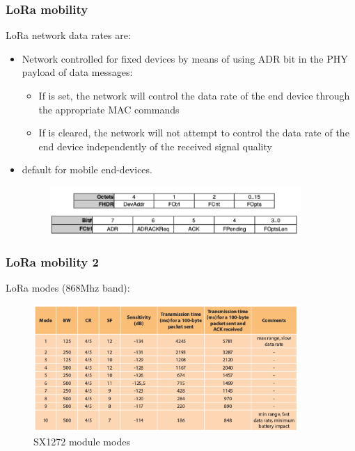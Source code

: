\begin{frame}[fragile]
  \frametitle{LoRa mobility}
  LoRa network data rates are:
 \begin{itemize}
  \item Network controlled for fixed devices by means of using ADR bit in the PHY payload of data messages:
  \begin{itemize}
    \item If is set, the network will control the data rate of the end device through the appropriate MAC commands
    \item If is cleared, the network will not attempt to control the data rate of the end device independently of the received signal quality
  \end{itemize}
  \item default for mobile end-devices.
\begin{figure}
  \centering
  \includegraphics[width=0.9\textwidth]{img/PHYpayload.png}
  \end{figure}
 \end{itemize}
\end{frame}

\begin{frame}[fragile]
  \frametitle{LoRa mobility 2}
  LoRa modes (868Mhz band):
\begin{figure}
  \centering
  \includegraphics[width=0.9\textwidth]{img/LoRamode.png}
  \caption{SX1272 module modes}
 \end{figure}

\end{frame}


